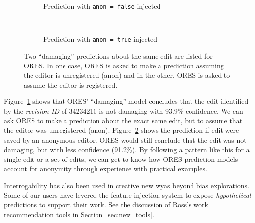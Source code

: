 \begin{figure*}[h]
\centering
\begin{subfigure}[t]{.5\textwidth}
  \caption{Prediction with \texttt{anon = false} injected}
  \label{fig:anon_injection_false}
\end{subfigure}~~
\begin{subfigure}[t]{.5\textwidth}
  \caption{Prediction with \texttt{anon = true} injected}
  \label{fig:anon_injection_true}
\end{subfigure}
\caption{Two ``damaging'' predictions about the same edit are listed for ORES.  In one case, ORES is asked to make a prediction assuming the editor is unregistered (anon) and in the other, ORES is asked to assume the editor is registered.}
\label{fig:anon_injection}
\end{figure*}

Figure~\ref{fig:anon_injection_false} shows that ORES' ``damaging'' model concludes that the edit identified by the \emph{revision ID} of 34234210 is not damaging with 93.9\% confidence.  We can ask ORES to make a prediction about the exact same edit, but to assume that the editor was unregistered (anon). Figure~\ref{fig:anon_injection_true} shows the prediction if edit were saved by an anonymous editor.  ORES would still conclude that the edit was not damaging, but with less confidence (91.2\%).  By following a pattern like this for a single edit or a set of edits, we can get to know how ORES prediction models account for anonymity through experience with practical examples.

Interrogability has also been used in creative new wyas beyond bias explorations.  Some of our users have levered the feature injection system to expose \emph{hypothetical} predictions to support their work.  See the discussion of Ross's work recommendation tools in Section~\ref{sec:new_tools}.
